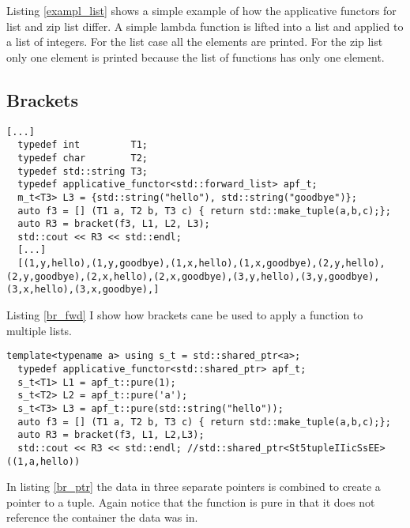 \documentclass[12pt,fleqn]{article}
\begin{document}
Listing \ref{exampl_list} shows a simple example of how the applicative functors for list and zip list differ. 
A simple lambda function is lifted into a list and applied to a list of integers. 
For the list case all the elements are printed. For the zip list only one element is printed because the list of functions has only one element.
   
%
%
%
\subsection{Brackets}
%
%
%
%
\begin{minipage}{\linewidth}
\begin{lstlisting}[caption=applicative functor for the std::forward\_list using brackets, label=br_fwd]
[...]
  typedef int         T1;
  typedef char        T2;
  typedef std::string T3;
  typedef applicative_functor<std::forward_list> apf_t;
  m_t<T3> L3 = {std::string("hello"), std::string("goodbye")};
  auto f3 = [] (T1 a, T2 b, T3 c) { return std::make_tuple(a,b,c);};
  auto R3 = bracket(f3, L1, L2, L3);
  std::cout << R3 << std::endl;
  [...]
  [(1,y,hello),(1,y,goodbye),(1,x,hello),(1,x,goodbye),(2,y,hello),(2,y,goodbye),(2,x,hello),(2,x,goodbye),(3,y,hello),(3,y,goodbye),(3,x,hello),(3,x,goodbye),]
\end{lstlisting}
\end{minipage}
%
%
%

Listing \ref{br_fwd} I show how brackets cane be used to apply a function to multiple lists.

%
%
%
\begin{minipage}{\linewidth}
\begin{lstlisting}[caption=applicative functor for shared pointers applied using bracket notation, label=br_ptr]
  template<typename a> using s_t = std::shared_ptr<a>;
  typedef applicative_functor<std::shared_ptr> apf_t;
  s_t<T1> L1 = apf_t::pure(1);
  s_t<T2> L2 = apf_t::pure('a');
  s_t<T3> L3 = apf_t::pure(std::string("hello"));
  auto f3 = [] (T1 a, T2 b, T3 c) { return std::make_tuple(a,b,c);};
  auto R3 = bracket(f3, L1, L2,L3);
  std::cout << R3 << std::endl; //std::shared_ptr<St5tupleIIicSsEE>((1,a,hello))
\end{lstlisting}
\end{minipage}
%
%
%

In listing \ref{br_ptr} the data in three separate pointers is combined to create a pointer to a tuple.
Again notice that the function is pure in that it does not reference the container the data was in.
  
\end{document}
